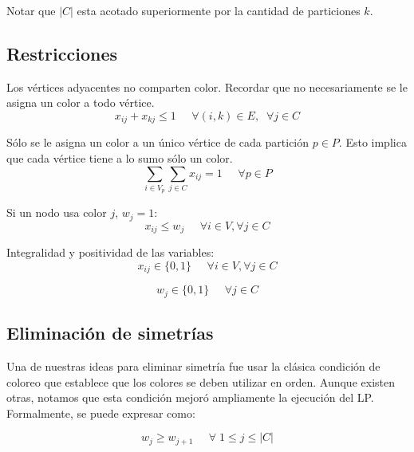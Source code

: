 Notar que $|C|$ esta acotado superiormente por la cantidad de particiones $k$.

\vspace{10px}

\subsection{Restricciones}
\label{restricciones}

Los vértices adyacentes no comparten color. Recordar que no necesariamente se le asigna un color a todo vértice.
\begin{equation}
x_{ij} + x_{kj} \leq 1 \;\;\;\;\; \forall (i,k) \in E,\;\; \forall j \in C
\end{equation}

Sólo se le asigna un color a un único vértice de cada partición $p \in P$. Esto implica que cada vértice tiene a lo sumo sólo un color.
\begin{equation}
\sum_{i \in V_p} \sum_{j \in C} x_{ij} = 1 \;\;\;\;\; \forall p \in P
\end{equation}

Si un nodo usa color $j$, $w_j = 1$:
\begin{equation}
x_{ij} \leq w_j \;\;\;\;\; \forall i \in V, \forall j \in C
\end{equation}

Integralidad y positividad de las variables:
\begin{equation}
x_{ij} \in \{0,1\} \;\;\;\;\; \forall i \in V, \forall j \in C
\end{equation}

\begin{equation}
w_j \in \{0,1\} \;\;\;\;\; \forall j \in C
\end{equation}

\subsection{Eliminación de simetrías}
\label{simetria}

Una de nuestras ideas para eliminar simetría fue usar la clásica condición de coloreo que establece que los colores se deben utilizar en orden. Aunque existen otras, notamos que esta condición mejoró ampliamente la ejecución del LP. Formalmente, se puede expresar como:

\begin{equation}
w_j \geq w_{j+1} \;\;\;\;\; \forall \; 1 \leq j \leq |C|
\end{equation}
